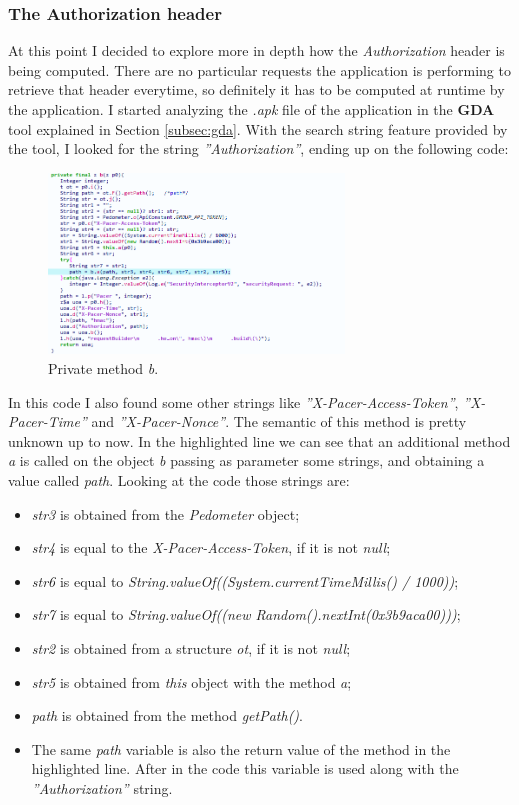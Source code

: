 		\subsubsection{The Authorization header}
			\par At this point I decided to explore more in depth how the \textit{Authorization} header is being computed. There are no particular requests the application is performing to retrieve that header everytime, so definitely it has to be computed at runtime by the application.\newline
			I started analyzing the \textit{.apk} file of the application in the \textbf{GDA} tool explained in Section \ref{subsec:gda}. With the search string feature provided by the tool, I looked for the string \textit{''Authorization''}, ending up on the following code:
			\begin{figure}[ht]
				\centering
				\includegraphics[width=0.7\textwidth]{images/pacer_gda1.png}
				\caption{Private method \textit{b}.}
			\end{figure}
			\par In this code I also found some other strings like \textit{''X-Pacer-Access-Token''}, \textit{''X-Pacer-Time''} and \textit{''X-Pacer-Nonce''}. The semantic of this method is pretty unknown up to now. In the highlighted line we can see that an additional method \textit{a} is called on the object \textit{b} passing as parameter some strings, and obtaining a value called \textit{path}. Looking at the code those strings are:
			\begin{itemize}
				\item \textit{str3} is obtained from the \textit{Pedometer} object; 
				\item \textit{str4} is equal to the \textit{X-Pacer-Access-Token}, if it is not \textit{null};
				\item \textit{str6} is equal to \textit{String.valueOf((System.currentTimeMillis() / 1000))};
				\item \textit{str7} is equal to \textit{String.valueOf((new Random().nextInt(0x3b9aca00)))}; 
				\item \textit{str2} is obtained from a structure \textit{ot}, if it is not \textit{null}; 
				\item \textit{str5} is obtained from \textit{this} object with the method \textit{a};
				\item \textit{path} is obtained from the method \textit{getPath()}.
				\item The same \textit{path} variable is also the return value of the method in the highlighted line. After in the code this variable is used along with the \textit{''Authorization''} string.
			\end{itemize} 
